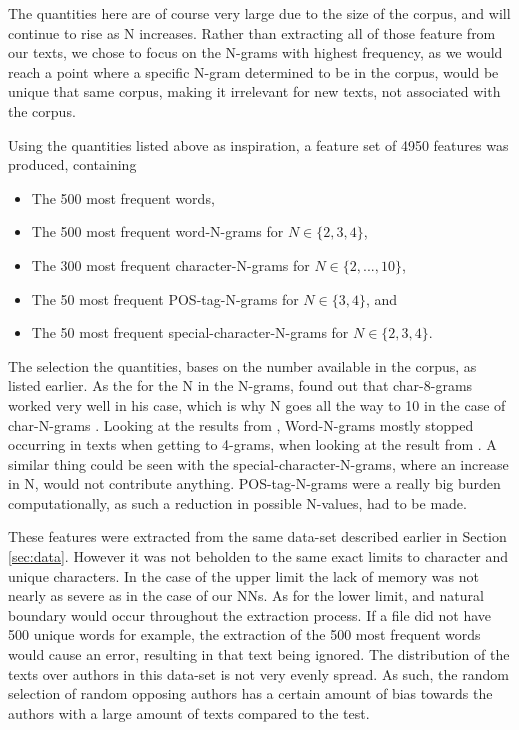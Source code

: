 The quantities here are of course very large due to the size of the corpus,
and will continue to rise as N increases. Rather than extracting all
of those feature from our texts, we chose to focus on the N-grams
with highest frequency, as we would reach a point where a specific N-gram
determined to be in the corpus, would be unique that same corpus, making it
irrelevant for new texts, not associated with the corpus.

Using the quantities listed above as inspiration, a feature set of 4950
features was produced, containing

\begin{itemize}
    \item The 500 most frequent words,
    \item The 500 most frequent word-N-grams for $N \in \{2,3,4\}$,
    \item The 300 most frequent character-N-grams for $N \in \{2,...,10\}$,
    \item The 50 most frequent \gls{POS}-tag-N-grams for $N \in \{3,4\}$, and
    \item The 50 most frequent special-character-N-grams for $N \in \{2,3,4\}$.
\end{itemize}

The selection the quantities, bases on the number available in the corpus,
as listed earlier. As the for the N in the N-grams, \cite{aalykke2016} found
out that char-8-grams worked very well in his case, which is why N goes all
the way to 10 in the case of char-N-grams . Looking at the results
from \cite{US}, Word-N-grams mostly stopped occurring in texts when getting
to 4-grams, when looking at the result from \cite{US}. A similar thing
could be seen with the special-character-N-grams, where an increase in N,
would not contribute anything. \gls{POS}-tag-N-grams were a really big burden
computationally, as such a reduction in possible N-values, had to be made.

These features were extracted from the same data-set described earlier in
Section \ref{sec:data}. However it was not beholden to the same exact limits to
character and unique characters. In the case of the upper limit the lack of
memory was not nearly as severe as in the case of our \gls{NN}s. As for the lower
limit, and natural boundary would occur throughout the extraction process.
If a file did not have 500 unique words for example, the extraction
of the 500 most frequent words would cause an error, resulting in that
text being ignored.
The distribution of the texts over authors in this data-set is not
very evenly spread. As such, the random selection of random opposing
authors has a certain amount of bias towards the authors with a large
amount of texts compared to the test.

